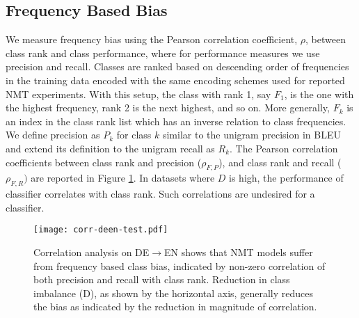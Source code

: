 \subsection{Frequency Based Bias}
We measure frequency bias using the Pearson correlation coefficient, $\rho$, between class rank and class performance, where for performance measures we use precision and recall.
Classes are ranked based on descending order of frequencies in the training data encoded with the same encoding schemes used for reported NMT experiments.
With this setup, the class with rank 1, say $F_1$, is the one with the highest frequency, rank 2 is the next highest, and so on.
More generally, $F_k$ is an index in the class rank list which has an inverse relation to class frequencies.
We define precision as $P_k$ for class $k$ similar to the unigram precision in BLEU and extend its definition to the unigram recall as $R_k$.
The Pearson correlation coefficients between class rank and precision ($\rho_{F, P}$), and class rank and recall ($\rho_{F, R})$ are reported in Figure \ref{fig:corr-deen-test}.
In datasets where $D$ is high, the performance of classifier correlates with class rank. Such correlations are undesired for a classifier.
\begin{figure}[ht]
    \centering
    \texttt{[image: corr-deen-test.pdf]}
        \caption{Correlation analysis on DE$\rightarrow$EN shows that NMT models suffer from frequency based class bias, indicated by non-zero correlation of both precision and recall with class rank.
        Reduction in class imbalance (D), as shown by the horizontal axis, generally reduces the bias as indicated by the reduction in magnitude of correlation.}
         \label{fig:corr-deen-test}
\end{figure}

